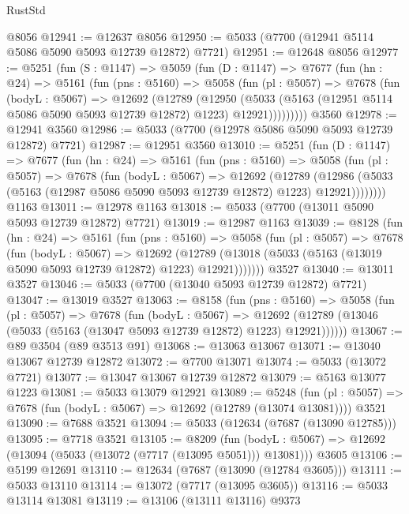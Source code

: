 \begin{lexlean}{RustStd}
\begin{coremodule}
    @8056
@12941 := @12637 @8056
@12950 := @5033 (@7700 (@12941 @5114 @5086 @5090 @5093 @12739 @12872) @7721)
@12951 := @12648 @8056
@12977 := @5251
    (fun (S : @1147) =>
    @5059
      (fun (D : @1147) =>
      @7677
        (fun (hn : @24) =>
        @5161
          (fun (pns : @5160) =>
          @5058
            (fun (pl : @5057) =>
            @7678
              (fun (bodyL : @5067) =>
              @12692
                (@12789
                  (@12950
                    (@5033
                      (@5163 (@12951 @5114 @5086 @5090 @5093 @12739 @12872) @1223)
                      @12921)))))))))
    @3560
@12978 := @12941 @3560
@12986 := @5033 (@7700 (@12978 @5086 @5090 @5093 @12739 @12872) @7721)
@12987 := @12951 @3560
@13010 := @5251
    (fun (D : @1147) =>
    @7677
      (fun (hn : @24) =>
      @5161
        (fun (pns : @5160) =>
        @5058
          (fun (pl : @5057) =>
          @7678
            (fun (bodyL : @5067) =>
            @12692
              (@12789
                (@12986 (@5033 (@5163 (@12987 @5086 @5090 @5093 @12739 @12872) @1223) @12921))))))))
    @1163
@13011 := @12978 @1163
@13018 := @5033 (@7700 (@13011 @5090 @5093 @12739 @12872) @7721)
@13019 := @12987 @1163
@13039 := @8128
    (fun (hn : @24) =>
    @5161
      (fun (pns : @5160) =>
      @5058
        (fun (pl : @5057) =>
        @7678
          (fun (bodyL : @5067) =>
          @12692
            (@12789 (@13018 (@5033 (@5163 (@13019 @5090 @5093 @12739 @12872) @1223) @12921)))))))
    @3527
@13040 := @13011 @3527
@13046 := @5033 (@7700 (@13040 @5093 @12739 @12872) @7721)
@13047 := @13019 @3527
@13063 := @8158
    (fun (pns : @5160) =>
    @5058
      (fun (pl : @5057) =>
      @7678
        (fun (bodyL : @5067) =>
        @12692 (@12789 (@13046 (@5033 (@5163 (@13047 @5093 @12739 @12872) @1223) @12921))))))
@13067 := @89 @3504 (@89 @3513 @91)
@13068 := @13063 @13067
@13071 := @13040 @13067 @12739 @12872
@13072 := @7700 @13071
@13074 := @5033 (@13072 @7721)
@13077 := @13047 @13067 @12739 @12872
@13079 := @5163 @13077 @1223
@13081 := @5033 @13079 @12921
@13089 := @5248
    (fun (pl : @5057) => @7678 (fun (bodyL : @5067) => @12692 (@12789 (@13074 @13081))))
    @3521
@13090 := @7688 @3521
@13094 := @5033 (@12634 (@7687 (@13090 @12785)))
@13095 := @7718 @3521
@13105 := @8209
    (fun (bodyL : @5067) => @12692 (@13094 (@5033 (@13072 (@7717 (@13095 @5051))) @13081)))
    @3605
@13106 := @5199 @12691
@13110 := @12634 (@7687 (@13090 (@12784 @3605)))
@13111 := @5033 @13110
@13114 := @13072 (@7717 (@13095 @3605))
@13116 := @5033 @13114 @13081
@13119 := @13106 (@13111 @13116) @9373

\end{coremodule}
\end{lexlean}
